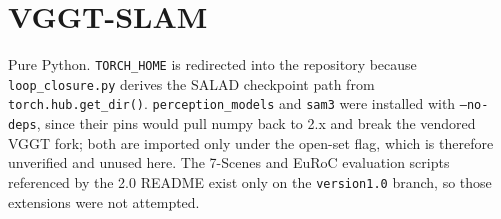 \section{VGGT-SLAM}
Pure Python. \texttt{TORCH\_HOME} is redirected into the repository because
\texttt{loop\_closure.py} derives the SALAD checkpoint path from
\texttt{torch.hub.get\_dir()}. \texttt{perception\_models} and \texttt{sam3}
were installed with \texttt{--no-deps}, since their pins would pull numpy back
to 2.x and break the vendored VGGT fork; both are imported only under the
open-set flag, which is therefore unverified and unused here. The
7-Scenes and EuRoC evaluation scripts referenced by the 2.0 README exist only
on the \texttt{version1.0} branch, so those extensions were not attempted.
